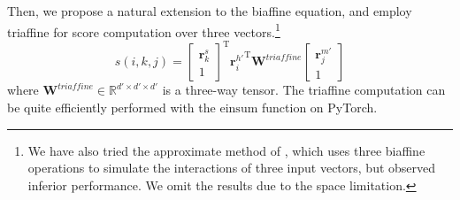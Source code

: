 Then, we
propose a natural extension to the biaffine equation, and employ triaffine for score computation over three vectors.\footnote{
    We have also tried the approximate method of \citet{wang-etal-2019-second}, which uses three
    biaffine operations to simulate the interactions of three input vectors, but observed inferior performance.
    We omit the results due to the space limitation.
}
\begin{equation} \label{equation:triaffine}
    s(i,k,j) =
    \left[
        \begin{array}{c}
            \mathbf{r}_{k}^{s} \\
            1
        \end{array}
        \right]^\mathrm{T}
    {\mathbf{r}_{i}^{h'}}^\mathrm{T}
    \mathbf{W}^\textit{triaffine}
    \left[
        \begin{array}{c}
            \mathbf{r}_{j}^{m'} \\
            1
        \end{array}
        \right]
\end{equation}
where $\mathbf{W}^\textit{triaffine} \in \mathbb{R}^{d' \times d' \times d'}$ is a three-way tensor.
The triaffine computation can be quite efficiently performed with the $\mathrm{einsum}$ function on PyTorch.




